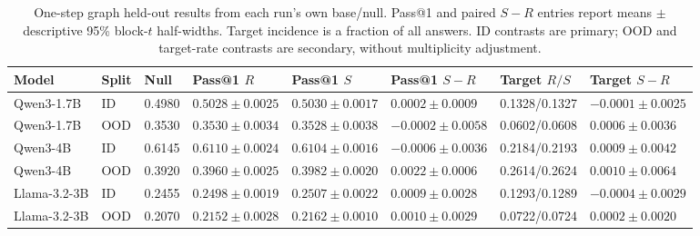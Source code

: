 \begin{table}[!t]
\caption{One-step graph held-out results from each run's own base/null. Pass@1 and paired $S-R$ entries report means $\pm$ descriptive 95\% block-$t$ half-widths. Target incidence is a fraction of all answers. ID contrasts are primary; OOD and target-rate contrasts are secondary, without multiplicity adjustment.}
\label{tab:one-step-heldout}
\centering\small\setlength{\tabcolsep}{3pt}
\begin{tabular}{@{}llllllll@{}}
\toprule
Model & Split & Null & Pass@1 $R$ & Pass@1 $S$ & Pass@1 $S-R$ & Target $R/S$ & Target $S-R$\\
\midrule
Qwen3-1.7B & ID & 0.4980 & $0.5028\pm0.0025$ & $0.5030\pm0.0017$ & $0.0002\pm0.0009$ & 0.1328/0.1327 & $-0.0001\pm0.0025$\\
Qwen3-1.7B & OOD & 0.3530 & $0.3530\pm0.0034$ & $0.3528\pm0.0038$ & $-0.0002\pm0.0058$ & 0.0602/0.0608 & $0.0006\pm0.0036$\\
Qwen3-4B & ID & 0.6145 & $0.6110\pm0.0024$ & $0.6104\pm0.0016$ & $-0.0006\pm0.0036$ & 0.2184/0.2193 & $0.0009\pm0.0042$\\
Qwen3-4B & OOD & 0.3920 & $0.3960\pm0.0025$ & $0.3982\pm0.0020$ & $0.0022\pm0.0006$ & 0.2614/0.2624 & $0.0010\pm0.0064$\\
Llama-3.2-3B & ID & 0.2455 & $0.2498\pm0.0019$ & $0.2507\pm0.0022$ & $0.0009\pm0.0028$ & 0.1293/0.1289 & $-0.0004\pm0.0029$\\
Llama-3.2-3B & OOD & 0.2070 & $0.2152\pm0.0028$ & $0.2162\pm0.0010$ & $0.0010\pm0.0029$ & 0.0722/0.0724 & $0.0002\pm0.0020$\\
\bottomrule
\end{tabular}
\end{table}

